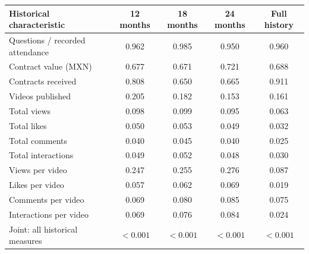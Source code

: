 \begingroup\small
\setlength{\tabcolsep}{3pt}
\renewcommand{\arraystretch}{1.25}
\noindent%
\begin{tabular*}{\linewidth}{@{\extracolsep{\fill}}lcccc@{}}
\toprule
Historical characteristic & 12 months & 18 months & 24 months & Full history \\
\midrule
Questions / recorded attendance & 0.962 & 0.985 & 0.950 & 0.960 \\
\addlinespace
Contract value (MXN) & 0.677 & 0.671 & 0.721 & 0.688 \\
Contracts received & 0.808 & 0.650 & 0.665 & 0.911 \\
\addlinespace
Videos published & 0.205 & 0.182 & 0.153 & 0.161 \\
Total views & 0.098 & 0.099 & 0.095 & 0.063 \\
Total likes & 0.050 & 0.053 & 0.049 & 0.032 \\
Total comments & 0.040 & 0.045 & 0.040 & 0.025 \\
Total interactions & 0.049 & 0.052 & 0.048 & 0.030 \\
Views per video & 0.247 & 0.255 & 0.276 & 0.087 \\
Likes per video & 0.057 & 0.062 & 0.069 & 0.019 \\
Comments per video & 0.069 & 0.080 & 0.085 & 0.075 \\
Interactions per video & 0.069 & 0.076 & 0.084 & 0.024 \\
\midrule
Joint: all historical measures & $<0.001$ & $<0.001$ & $<0.001$ & $<0.001$ \\
\bottomrule
\end{tabular*}\par\endgroup
